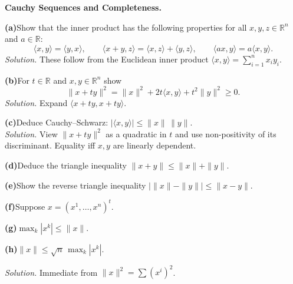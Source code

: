 \begin{problem}[CP-II-0274]
\label{prob:cp-ii-0274}
\textbf{Cauchy Sequences and Completeness.}

\renewcommand\labelenumi{(\alph{enumi})}
\par\smallskip\noindent\textbf{(a)}\quad Show that the inner product has the following properties for all $x,y,z\in\mathbb{R}^n$ and $a\in\mathbb{R}$:
\[
\langle x,y\rangle=\langle y,x\rangle,\qquad
\langle x+y,z\rangle=\langle x,z\rangle+\langle y,z\rangle,\qquad
\langle ax,y\rangle=a\langle x,y\rangle.
\]
\textit{Solution.} These follow from the Euclidean inner product $\langle x,y\rangle=\sum_{i=1}^n x_i y_i$.

\par\smallskip\noindent\textbf{(b)}\quad For $t\in\mathbb{R}$ and $x,y\in\mathbb{R}^n$ show
\[
\|x+ty\|^2=\|x\|^2+2t\langle x,y\rangle+t^2\|y\|^2\ge 0.
\]
\textit{Solution.} Expand $\langle x+ty,x+ty\rangle$.

\par\smallskip\noindent\textbf{(c)}\quad Deduce Cauchy--Schwarz: $|\langle x,y\rangle|\le \|x\|\,\|y\|$.\\
\textit{Solution.} View $\|x+ty\|^2$ as a quadratic in $t$ and use non-positivity of its discriminant.
Equality iff $x,y$ are linearly dependent.

\par\smallskip\noindent\textbf{(d)}\quad Deduce the triangle inequality $\|x+y\|\le \|x\|+\|y\|$.

\par\smallskip\noindent\textbf{(e)}\quad Show the reverse triangle inequality $|\|x\|-\|y\||\le \|x-y\|$.

\par\smallskip\noindent\textbf{(f)}\quad Suppose $x=(x^1,\dots,x^n)^t$.

\renewcommand\labelenumii{(\roman{enumii})}
\par\smallskip\noindent\textbf{(g)}\quad $\displaystyle \max_{k}|x^k|\le \|x\|$.
\par\smallskip\noindent\textbf{(h)}\quad $\displaystyle \|x\|\le \sqrt{n}\,\max_{k}|x^k|$.

\textit{Solution.} Immediate from $\|x\|^2=\sum (x^i)^2$.
\end{problem}

